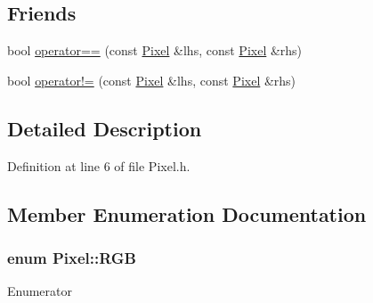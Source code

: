 \subsection*{Friends}
\begin{DoxyCompactItemize}
\item 
bool \hyperlink{class_pixel_aacd4ab1e37e7b6507b3580d2a3cd0fd9}{operator==} (const \hyperlink{class_pixel}{Pixel} \&lhs, const \hyperlink{class_pixel}{Pixel} \&rhs)
\item 
bool \hyperlink{class_pixel_a96c765b304a1ef8aad3e454b02d21de5}{operator!=} (const \hyperlink{class_pixel}{Pixel} \&lhs, const \hyperlink{class_pixel}{Pixel} \&rhs)
\end{DoxyCompactItemize}


\subsection{Detailed Description}


Definition at line 6 of file Pixel.\+h.



\subsection{Member Enumeration Documentation}
\subsubsection[{\texorpdfstring{R\+GB}{RGB}}]{\setlength{\rightskip}{0pt plus 5cm}enum {\bf Pixel\+::\+R\+GB}\hspace{0.3cm}{\ttfamily [strong]}}\hypertarget{class_pixel_ac2ab5194684b31a50d429b26a0569ed9}{}\label{class_pixel_ac2ab5194684b31a50d429b26a0569ed9}
\begin{Desc}
\item[Enumerator]\par
\begin{description}
\item[{\em 
R\hypertarget{class_pixel_ac2ab5194684b31a50d429b26a0569ed9ae1e1d3d40573127e9ee0480caf1283d6}{}\label{class_pixel_ac2ab5194684b31a50d429b26a0569ed9ae1e1d3d40573127e9ee0480caf1283d6}
}]\item[{\em 
G\hypertarget{class_pixel_ac2ab5194684b31a50d429b26a0569ed9adfcf28d0734569a6a693bc8194de62bf}{}\label{class_pixel_ac2ab5194684b31a50d429b26a0569ed9adfcf28d0734569a6a693bc8194de62bf}
}]\item[{\em 
B\hypertarget{class_pixel_ac2ab5194684b31a50d429b26a0569ed9a9d5ed678fe57bcca610140957afab571}{}\label{class_pixel_ac2ab5194684b31a50d429b26a0569ed9a9d5ed678fe57bcca610140957afab571}
}]\end{description}
\end{Desc}



